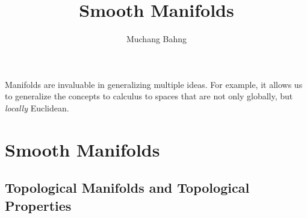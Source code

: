\documentclass{article}
\theoremstyle{remark}
\theoremstyle{definition}
\begin{document}
\pagestyle{fancy}

\cfoot{\thepage / \pageref{LastPage}}

\title{Smooth Manifolds}
\author{Muchang Bahng}

\maketitle
\tableofcontents
\pagebreak 

Manifolds are invaluable in generalizing multiple ideas. For example, it allows us to generalize the concepts to calculus to spaces that are not only globally, but \textit{locally} Euclidean. 

\section{Smooth Manifolds}

  \subsection{Topological Manifolds and Topological Properties}
\end{document}
